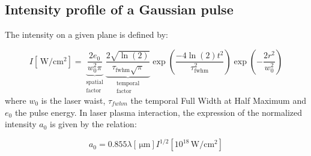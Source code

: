 \subsection{Intensity profile of a Gaussian pulse}

\noindent The intensity on a given plane is defined by:

\begin{equation}
I[\,\mathrm{ W/cm^2}] = \underbrace{\frac{2e_0}{w_0^2\pi}}_{\substack{\text{spatial}\\\text{factor}}}\underbrace{\frac{2\sqrt{\ln(2)}}{\tau_{\text{fwhm}}\sqrt{\pi}}}_{\substack{\text{temporal}\\\text{factor}}}\exp(\frac{-4\ln(2)t^2}{\tau_{\text{fwhm}}^2})\exp(-\frac{2r^2}{w_0^2})
\end{equation}
where $w_0$ is the laser waist, $\tau_{fwhm}$ the temporal Full Width at Half Maximum and $e_0$ the pulse energy. In laser plasma interaction, the expression of the normalized intensity $a_0$ is given by the relation:

\begin{equation}
a_0 = 0.855\lambda[\,\mathrm{\mu m}] I^{1/2}[10^{18}\,\mathrm{W/cm^2}]
\end{equation}

